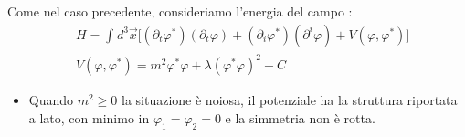 \documentclass[../main.tex]{subfiles}
\begin{document}
Come nel caso precedente, consideriamo l'energia del campo 
:
\begin{align*}
    &H=\int_{}d^3\Vec{x}\bigg[ (\partial_t\varphi^\ast)(\partial_t\varphi) + (\partial_i\varphi^\ast)(\partial^i\varphi) + V(\varphi, \varphi^\ast)\bigg]\\
    &V(\varphi, \varphi^\ast) = m^2\varphi^\ast\varphi + \lambda(\varphi^\ast\varphi)^2 + C
\end{align*}
\begin{itemize}
    \item Quando $m^2\geq 0$ la situazione è noiosa, il potenziale ha la struttura riportata a lato, con minimo in $\varphi_1=\varphi_2=0$ e la simmetria non è rotta.


\end{itemize}
\end{document}

